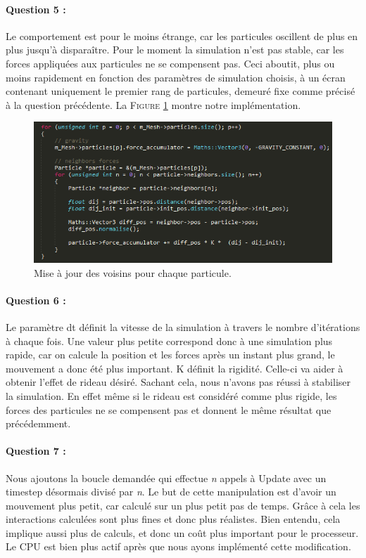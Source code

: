 \documentclass[a4paper,12pt]{article}
\begin{document}
\paragraph{Question 5 :} Le comportement est pour le moins étrange, car les particules oscillent de plus en plus jusqu'à disparaître. Pour le moment la simulation n'est pas stable, car les forces appliquées aux particules ne se compensent pas. Ceci aboutit, plus ou moins rapidement en fonction des paramètres de simulation choisis, à un écran contenant uniquement le premier rang de particules, demeuré fixe comme précisé à la question précédente.
La \textsc{Figure} \ref{fig:q5} montre notre implémentation.
\begin{figure}
  \centering
  \includegraphics{images/q5.png}
  \caption{Mise à jour des voisins pour chaque particule.}
  \label{fig:q5}
\end{figure}

\paragraph{Question 6 :} Le paramètre \og{}dt\fg{} définit la vitesse de la simulation à travers le nombre d'itérations à chaque fois. Une valeur plus petite correspond donc à une simulation plus rapide, car on calcule la position et les forces après un instant plus grand, le mouvement a donc été plus important.
K définit la rigidité. Celle-ci va aider à obtenir l'effet de rideau désiré. Sachant cela, nous n'avons pas réussi à stabiliser la simulation. En effet même si le rideau est considéré comme plus rigide, les forces des particules ne se compensent pas et donnent le même résultat que précédemment.

\paragraph{Question 7 :} Nous ajoutons la boucle demandée qui effectue \textit{n} appels à \og{}Update\fg{} avec un timestep désormais divisé par \textit{n}. Le but de cette manipulation est d'avoir un mouvement plus petit, car calculé sur un plus petit pas de temps. Grâce à cela les interactions calculées sont plus fines et donc plus réalistes. Bien entendu, cela implique aussi plus de calculs, et donc un coût plus important pour le processeur. Le CPU est bien plus actif après que nous ayons implémenté cette modification. 
\end{document}
